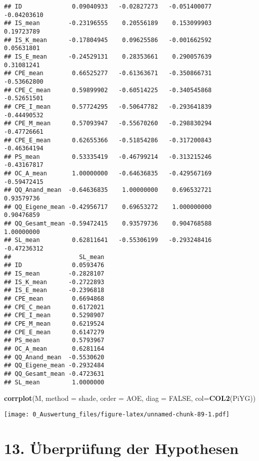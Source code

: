 \documentclass[
]{article}
\newenvironment{Shaded}{\begin{snugshade}}{\end{snugshade}}
\newcommand{\AttributeTok}[1]{\textcolor[rgb]{0.13,0.29,0.53}{#1}}
\newcommand{\ConstantTok}[1]{\textcolor[rgb]{0.56,0.35,0.01}{#1}}
\newcommand{\FunctionTok}[1]{\textcolor[rgb]{0.13,0.29,0.53}{\textbf{#1}}}
\newcommand{\NormalTok}[1]{#1}
\newcommand{\StringTok}[1]{\textcolor[rgb]{0.31,0.60,0.02}{#1}}
\begin{document}
\begin{verbatim}
## ID              0.09040933   -0.02827273   -0.051400077    -0.04203610
## IS_mean        -0.23196555    0.20556189    0.153099903     0.19723789
## IS_K_mean      -0.17804945    0.09625586   -0.001662592     0.05631801
## IS_E_mean      -0.24529131    0.28353661    0.290057639     0.31081241
## CPE_mean        0.66525277   -0.61363671   -0.350866731    -0.53662800
## CPE_C_mean      0.59899902   -0.60514225   -0.340545868    -0.52651501
## CPE_I_mean      0.57724295   -0.50647782   -0.293641839    -0.44490532
## CPE_M_mean      0.57093947   -0.55670260   -0.298830294    -0.47726661
## CPE_E_mean      0.62655366   -0.51854286   -0.317200843    -0.46364194
## PS_mean         0.53335419   -0.46799214   -0.313215246    -0.43167817
## OC_A_mean       1.00000000   -0.64636835   -0.429567169    -0.59472415
## QQ_Anand_mean  -0.64636835    1.00000000    0.696532721     0.93579736
## QQ_Eigene_mean -0.42956717    0.69653272    1.000000000     0.90476859
## QQ_Gesamt_mean -0.59472415    0.93579736    0.904768588     1.00000000
## SL_mean         0.62811641   -0.55306199   -0.293248416    -0.47236312
##                   SL_mean
## ID              0.0593476
## IS_mean        -0.2828107
## IS_K_mean      -0.2722893
## IS_E_mean      -0.2396818
## CPE_mean        0.6694868
## CPE_C_mean      0.6172021
## CPE_I_mean      0.5298907
## CPE_M_mean      0.6219524
## CPE_E_mean      0.6147279
## PS_mean         0.5793967
## OC_A_mean       0.6281164
## QQ_Anand_mean  -0.5530620
## QQ_Eigene_mean -0.2932484
## QQ_Gesamt_mean -0.4723631
## SL_mean         1.0000000
\end{verbatim}

\begin{Shaded}
\begin{Highlighting}[]
\FunctionTok{corrplot}\NormalTok{(M, }\AttributeTok{method =} \StringTok{\textquotesingle{}shade\textquotesingle{}}\NormalTok{, }\AttributeTok{order =} \StringTok{\textquotesingle{}AOE\textquotesingle{}}\NormalTok{, }\AttributeTok{diag =} \ConstantTok{FALSE}\NormalTok{, }\AttributeTok{col=}\FunctionTok{COL2}\NormalTok{(}\StringTok{\textquotesingle{}PiYG\textquotesingle{}}\NormalTok{))}
\end{Highlighting}
\end{Shaded}

\texttt{[image: 0\_Auswertung\_files/figure-latex/unnamed-chunk-89-1.pdf]}

\section{13. Überprüfung der
Hypothesen}\label{uxfcberpruxfcfung-der-hypothesen}
\end{document}
